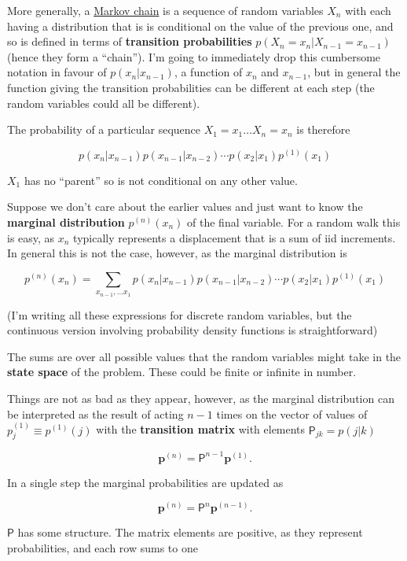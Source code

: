 \documentclass[
  letterpaper,
  DIV=11,
  numbers=noendperiod]{scrreprt}
\theoremstyle{definition}
\theoremstyle{remark}
\begin{document}
More generally, a
\href{https://en.wikipedia.org/wiki/Markov_chain}{Markov chain} is a
sequence of random variables \(X_n\) with each having a distribution
that is is conditional on the value of the previous one, and so is
defined in terms of \textbf{transition probabilities}
\(p(X_{n}=x_n|X_{n-1}=x_{n-1})\) (hence they form a ``chain''). I'm
going to immediately drop this cumbersome notation in favour of
\(p(x_n|x_{n-1})\), a function of \(x_n\) and \(x_{n-1}\), but in
general the function giving the transition probabilities can be
different at each step (the random variables could all be different).

The probability of a particular sequence \(X_1=x_1\ldots X_n=x_n\) is
therefore

\[
p(x_n|x_{n-1})p(x_{n-1}|x_{n-2})\cdots p(x_2|x_{1})p^{(1)}(x_1)
\]

\(X_1\) has no ``parent'' so is not conditional on any other value.

Suppose we don't care about the earlier values and just want to know the
\textbf{marginal distribution} \(p^{(n)}(x_n)\) of the final variable.
For a random walk this is easy, as \(x_n\) typically represents a
displacement that is a sum of iid increments. In general this is not the
case, however, as the marginal distribution is

\[
p^{(n)}(x_n)=\sum_{x_{n-1},\ldots x_1}p(x_n|x_{n-1})p(x_{n-1}|x_{n-2})\cdots p(x_2|x_{1})p^{(1)}(x_1)
\]

(I'm writing all these expressions for discrete random variables, but
the continuous version involving probability density functions is
straightforward)

The sums are over all possible values that the random variables might
take in the \textbf{state space} of the problem. These could be finite
or infinite in number.

Things are not as bad as they appear, however, as the marginal
distribution can be interpreted as the result of acting \(n-1\) times on
the vector of values of \(p^{(1)}_j\equiv p^{(1)}(j)\) with the
\textbf{transition matrix} with elements \(\mathsf{P}_{jk}=p(j|k)\)

\[
\mathbf{p}^{(n)} = \mathsf{P}^{n-1}\mathbf{p}^{(1)}.
\]

In a single step the marginal probabilities are updated as

\[
\mathbf{p}^{(n)} = \mathsf{P}^{n}\mathbf{p}^{(n-1)}.
\]

\(\mathsf{P}\) has some structure. The matrix elements are positive, as
they represent probabilities, and each row sums to one
\end{document}
